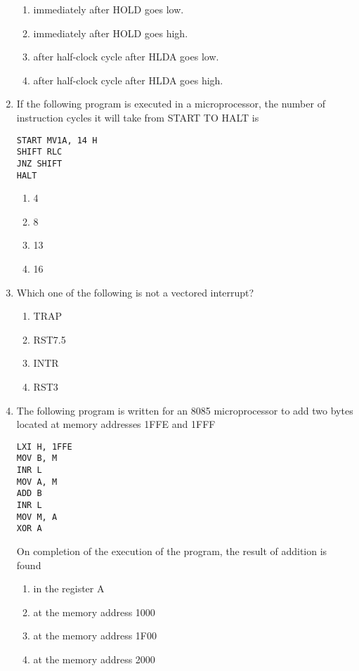 \documentclass[journal,12pt,twocolumn]{IEEEtran}
\begin{document}
\begin{enumerate}
    \begin{enumerate}
      \item immediately after HOLD goes low. 
      \item immediately after HOLD goes high.
      \item after half-clock cycle after HLDA goes low.
      \item after half-clock cycle after HLDA goes high.
    \end{enumerate}
    \item  If the following program is executed in a microprocessor, the number of
instruction cycles it will take from START TO HALT is\\
\begin{verbatim}
START MV1A, 14 H 
SHIFT RLC        
JNZ SHIFT        
HALT
\end{verbatim}
     \begin{enumerate}
      \item 4 
      \item 8
      \item 13
      \item 16
    \end{enumerate}
    \item Which one of the following is not a vectored interrupt?\\
     \begin{enumerate}
      \item TRAP 
      \item RST7.5
      \item INTR 
      \item RST3
    \end{enumerate}
    \item The following program is written for an 8085 microprocessor to add two bytes
located at memory addresses 1FFE and 1FFF\\
\begin{verbatim}
LXI H, 1FFE
MOV B, M
INR L
MOV A, M
ADD B
INR L
MOV M, A
XOR A
\end{verbatim}
On completion of the execution of the program, the result of addition is found\\ 
     \begin{enumerate}
      \item in the register A
      \item at the memory address 1000
      \item at the memory address 1F00
      \item at the memory address 2000

\end{enumerate}
\end{enumerate}
\end{document}
